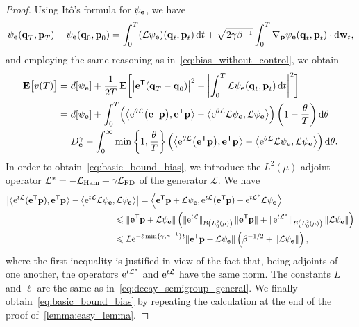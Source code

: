 \documentclass[11pt,a4paper]{article}
\begin{document}
\begin{proof}
    Using Itô's formula for $\psi_{\boldsymbol{\mathbf e}}$,
    we have
    \[
        \psi_{\boldsymbol{\mathbf e}}(\boldsymbol{\mathbf q}_T, \boldsymbol{\mathbf p}_T) - \psi_{\boldsymbol{\mathbf e}}(\boldsymbol{\mathbf q}_0, \boldsymbol{\mathbf p}_0)
        = \int_{0}^{T} (\mathcal L \psi_{\boldsymbol{\mathbf e}}) (\boldsymbol{\mathbf q}_t, \boldsymbol{\mathbf p}_t) \, \mathrm d t
        + \sqrt{2 \gamma \beta^{-1}} \int_{0}^{T} \nabla_{\boldsymbol{\mathbf p}} \psi_{\boldsymbol{\mathbf e}} (\boldsymbol{\mathbf q}_t, \boldsymbol{\mathbf p}_t) \cdot \mathrm d \boldsymbol{\mathbf w}_t,
    \]
    and employing the same reasoning as in~\eqref{eq:bias_without_control}, we obtain
    \begin{align*}
        \expect \bigl[v(T)\bigr]
    &= d[\psi_{\vect e}] +  \frac{1}{2T} \, \expect \biggl[ \bigl\lvert \vect e^\t (\vect q_T - \vect q_0) \bigr\rvert^2 - \biggl| \int_0^T {\mathcal L \psi_{\vect e}}(\vect q_t, \vect p_t) \, \d t \biggr|^2 \biggr] \\
    &= d[\psi_{\vect e}] +  \int_{0}^{T} \Bigl( \ip{\e^{\theta \mathcal L}\bigl(\vect e^\t \vect p\bigr)}{\vect e^\t \vect p} - \ip{\e^{\theta \mathcal L} \mathcal L \psi_{\vect e}}{\mathcal L \psi_{\vect e}} \Bigr) \left( 1 - \frac{\theta}{T} \right) \d \theta \\
    &= D^{\gamma}_{\vect e} - \int_{0}^{\infty} \min\left\{1, \frac{\theta}{T}\right\} \Bigl( \ip{\e^{\theta \mathcal L}\bigl(\vect e^\t \vect p\bigr)}{\vect e^\t  \vect p} - \ip{\e^{\theta \mathcal L} \mathcal L \psi_{\vect e}}{\mathcal L \psi_{\vect e}} \Bigr) \, \d \theta.
    \end{align*}
    In order to obtain~\eqref{eq:basic_bound_bias},
    we introduce the $L^2(\mu)$ adjoint operator
    \(
        \mathcal L^* = - \mathcal L_{\rm Ham} + \gamma \mathcal L_{\rm FD}
    \) of the generator $\mathcal L$.
    We have
    \begin{align*}
        \left\lvert \ip{\e^{t \mathcal L}(\vect e^\t \vect p)}{\vect e^\t \vect p} - \ip{\e^{t \mathcal L} \mathcal L \psi_{\vect e}}{\mathcal L \psi_{\vect e}} \right\rvert
    &= \ip{\vect e^\t \vect p + \mathcal L \psi_{\vect e}}{\e^{t \mathcal L} (\vect e^\t \vect p) - \e^{t \mathcal L^*} \mathcal  L\psi_{\vect e}} \\
    &\hspace{-1cm} \leq \norm*{\vect e^\t \vect p + \mathcal L \psi_{\vect e}}
    \left( \norm*{\e^{t \mathcal L}}[\mathcal B\left(L^2_0(\mu) \right)] \, \norm*{\vect e^\t \vect p} + \norm*{\e^{t \mathcal L^*}}[\mathcal B\left(L^2_0(\mu) \right)] \norm{\mathcal L \psi_{\vect e}} \right) \\
    &\hspace{-1cm} \leq L \e^{- \ell \min\{\gamma, \gamma^{-1}\} t} \norm*{\vect e^\t \vect p + \mathcal L\psi_{\vect e}}  \left(\beta^{-1/2} + \norm{\mathcal L \psi_{\vect e}} \right),
    \end{align*}
    where the first inequality is justified in view of the fact that,
    being adjoints of one another,
    the operators $\mathrm{e}^{t \mathcal L^*}$ and $\mathrm{e}^{t \mathcal L}$ have the same norm.
    The constants $L$ and $\ell$ are the same as in~\eqref{eq:decay_semigroup_general}.
    We finally obtain~\eqref{eq:basic_bound_bias} by repeating the calculation at the end of the proof of~\cref{lemma:easy_lemma}.
\end{proof}
\end{document}
